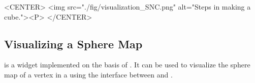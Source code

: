 \begin{ccHtmlOnly}
    <CENTER>
       <img src="./fig/visualization_SNC.png" alt="Steps in making a cube."><P>
    </CENTER>
\end{ccHtmlOnly}



\subsection{Visualizing a Sphere Map}

 is a widget implemented on the basis of 
. It can be used to visualize the sphere map 
of a vertex in a  using the interface between
 and .


